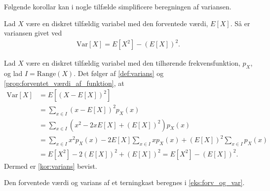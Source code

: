 Følgende korollar kan i nogle tilfælde simplificere beregningen af variansen.

\begin{minipage}\textwidth
\begin{kor} \textbf{}\label{kor:varians} %
\newline
Lad $X$ være en diskret tilfældig variabel med den forventede værdi, $E[X]$. Så er variansen givet ved
\begin{align*}
    \text{Var}[X]=E[X^2] - \left(E[X]\right)^2.
\end{align*}
\end{kor}
\end{minipage}

\begin{bev} \textbf{} %
\newline
Lad $X$ være en diskret tilfældig variabel med den tilhørende frekvensfunktion, $p_X$, og lad $I=\text{Range}(X)$. Det følger af \autoref{def:varians} og \autoref{prop:forventet_værdi_af_funktion}, at
\begin{align*}
    \text{Var}[X] &=E\left[\left(X-E[X]\right)^2\right] \\
    &=\sum_{x\in I}\left(x-E[X]\right)^2 p_X(x)\\
    &= \sum_{x\in I} \left(x^2-2xE[X]+\left(E[X]\right)^2\right)p_X(x)\\
    &= \sum_{x\in I} x^2p_X(x) - 2E[X] \sum_{x\in I} x p_X(x) + \left(E[X]\right)^2 \sum_{x\in I} p_X(x)\\
    &= E[X^2]-2\left(E[X]\right)^2+\left(E[X]\right)^2
    = E[X^2] - \left(E[X]\right)^2.
\end{align*}
Dermed er \autoref{kor:varians} bevist.
\end{bev}

Den forventede værdi og varians af et terningkast beregnes i \autoref{eks:forv_og_var}.

